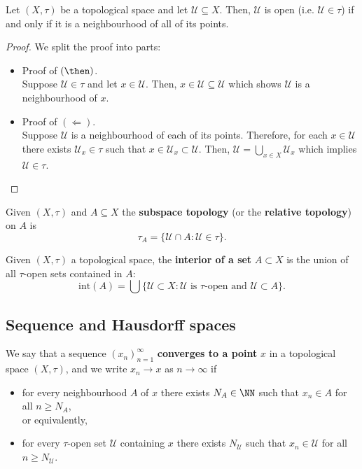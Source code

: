 \documentclass[12pt, a4paper]{article}
\newcommand{\UU}{\mathcal U}
\begin{document}
\begin{mdprop}
    Let \((X,\tau)\) be a topological space and let \(\UU \subseteq X\). Then, \(\UU\) is open (i.e. \(\UU \in \tau\))  if and only if it is a neighbourhood of all of its points.
\end{mdprop}

\begin{proof}
    We split the proof into parts:
    \begin{itemize}
        \item Proof of \((\then)\). \\
        Suppose \(\UU \in \tau\) and let \(x \in \UU\). Then, \(x \in \UU \subseteq \UU\) which shows \(\UU\) is a neighbourhood of \(x\).
        \item Proof of \((\Leftarrow)\). \\
        Suppose \(\UU\) is a neighbourhood of each of its points. Therefore, for each \(x \in \UU\) there exists \(\UU_x \in \tau\) such that \(x \in \UU_x \subset \UU\). Then, \(\UU = \bigcup_{x \in X} \UU_x\) which implies \(\UU \in \tau\).
    \end{itemize}
\end{proof}

\begin{definition}
    Given \((X, \tau)\) and \(A \subseteq X\) the \textbf{subspace topology} (or the \textbf{relative topology}) on \(A\) is 
    \[\tau_A = \{\mathcal{U} \cap A : \mathcal{U} \in \tau\}.\]
\end{definition}

\begin{definition}
    Given \((X,\tau)\) a topological space, the \textbf{interior of a set} \(A \subset X\) is the union of all \(\tau\)-open sets contained in \(A\):
    \[\text{int}(A) = \bigcup \{\mathcal{U} \subset X : \mathcal{U} \text{ is } \tau\text{-open and } \mathcal{U} \subset A\}.\]
\end{definition}

\subsection{Sequence and Hausdorff spaces}

\begin{definition}
    We say that a sequence \((x_n)_{n=1}^{\infty}\) \textbf{converges to a point} \(x\) in a topological space \((X,\tau)\), and we write \(x_n \to x\) as \(n \to \infty\) if 
    \begin{itemize}
        \item for every neighbourhood \(A\) of \(x\) there exists \(N_A \in \NN\) such that \(x_n \in A\) for all \(n \geq N_A\), \\
        or equivalently,
        \item for every \(\tau\)-open set \(\mathcal{U}\) containing \(x\) there exists \(N_{\mathcal{U}}\) such that \(x_n \in \mathcal{U}\) for all \(n \geq N_{\mathcal{U}}\).
    \end{itemize}
\end{definition}
\end{document}
